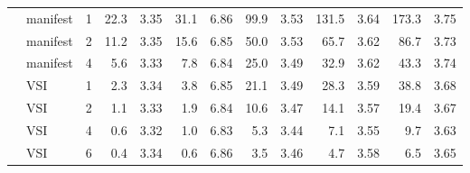 \begin{table}[t]
\begin{tabular}{llrrrrrrrrrrr}
 & manifest & 1 & 22.3 & 3.35 & 31.1 & 6.86 & 99.9 & 3.53 & 131.5 & 3.64 & 173.3 & 3.75\\
 & manifest & 2 & 11.2 & 3.35 & 15.6 & 6.85 & 50.0 & 3.53 & 65.7 & 3.62 & 86.7 & 3.73\\
 & manifest & 4 & 5.6 & 3.33 & 7.8 & 6.84 & 25.0 & 3.49 & 32.9 & 3.62 & 43.3 & 3.74\\
 & VSI & 1 & 2.3 & 3.34 & 3.8 & 6.85 & 21.1 & 3.49 & 28.3 & 3.59 & 38.8 & 3.68\\
 & VSI & 2 & 1.1 & 3.33 & 1.9 & 6.84 & 10.6 & 3.47 & 14.1 & 3.57 & 19.4 & 3.67\\
 & VSI & 4 & 0.6 & 3.32 & 1.0 & 6.83 & 5.3 & 3.44 & 7.1 & 3.55 & 9.7 & 3.63\\
 & VSI & 6 & 0.4 & 3.34 & 0.6 & 6.86 & 3.5 & 3.46 & 4.7 & 3.58 & 6.5 & 3.65\\
\bottomrule
\end{tabular}
\end{table}
